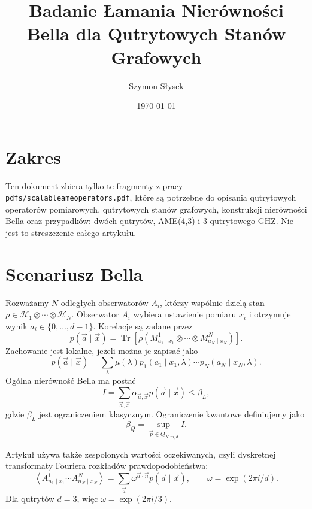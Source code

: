 \documentclass[12pt]{article}
\title{Badanie \L{}amania Nier\'owno\'sci Bella dla Qutrytowych Stan\'ow Grafowych}
\author{Szymon S\l{}ysek}
\date{\today}
\begin{document}
\maketitle
\tableofcontents
\newpage

\section{Zakres}

Ten dokument zbiera tylko te fragmenty z pracy \texttt{pdfs/scalableameoperators.pdf}, kt\'ore s\k{a}
potrzebne do opisania qutrytowych operator\'ow pomiarowych, qutrytowych stan\'ow grafowych,
konstrukcji nier\'owno\'sci Bella oraz przypadk\'ow: dw\'och qutryt\'ow, AME(4,3) i
3-qutrytowego GHZ. Nie jest to streszczenie ca\l{}ego artyku\l{}u.

\section{Scenariusz Bella}

Rozwa\.zamy $N$ odleg\l{}ych obserwator\'ow $A_i$, kt\'orzy wsp\'olnie dziel\k{a} stan
$\rho \in \mathcal{H}_1\otimes\cdots\otimes\mathcal{H}_N$. Obserwator $A_i$ wybiera
ustawienie pomiaru $x_i$ i otrzymuje wynik $a_i \in \{0,\ldots,d-1\}$. Korelacje s\k{a}
zadane przez
\begin{equation}
    p(\vec{a}\mid\vec{x})
    =
    \operatorname{Tr}\!\left[
        \rho\left(M^1_{a_1\mid x_1}\otimes\cdots\otimes M^N_{a_N\mid x_N}\right)
    \right].
\end{equation}
Zachowanie jest lokalne, je\.zeli mo\.zna je zapisa\'c jako
\begin{equation}
    p(\vec{a}\mid\vec{x})
    =
    \sum_{\lambda}\mu(\lambda)
    p_1(a_1\mid x_1,\lambda)\cdots p_N(a_N\mid x_N,\lambda).
\end{equation}
Og\'olna nier\'owno\'s\'c Bella ma posta\'c
\begin{equation}
    I=\sum_{\vec{a},\vec{x}}\alpha_{\vec{a},\vec{x}}p(\vec{a}\mid\vec{x})
    \leq \beta_L,
\end{equation}
gdzie $\beta_L$ jest ograniczeniem klasycznym. Ograniczenie kwantowe definiujemy jako
\begin{equation}
    \beta_Q=\sup_{\vec{p}\in Q_{N,m,d}} I.
\end{equation}

Artyku\l{} u\.zywa tak\.ze zespolonych warto\'sci oczekiwanych, czyli dyskretnej transformaty
Fouriera rozk\l{}ad\'ow prawdopodobie\'nstwa:
\begin{equation}
    \left\langle A^1_{n_1\mid x_1}\cdots A^N_{n_N\mid x_N}\right\rangle
    =
    \sum_{\vec{a}}\omega^{\vec{a}\cdot\vec{n}}p(\vec{a}\mid\vec{x}),
    \qquad
    \omega=\exp(2\pi i/d).
\end{equation}
Dla qutryt\'ow $d=3$, wi\k{e}c $\omega=\exp(2\pi i/3)$.
\end{document}
